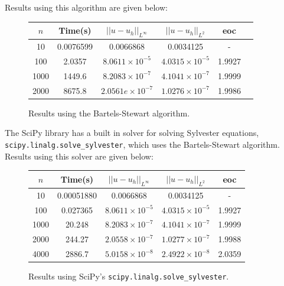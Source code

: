 \documentclass{article}
\numberwithin{equation}{section}
\begin{document}
Results using this algorithm are given below:

\begin{figure}
\begin{table}[H]
\centering
\begin{tabular}{|c|c|c|c|c|c|}
\hline
$n$ & Time(s) & $|| u - u_h ||_{L^{\infty}}$ &$|| u - u_h ||_{L^{2}}$ & eoc \\
\hline
10 & 0.0076599 & 0.0066868 & 0.0034125 & - \\
100 & 2.0357 & $8.0611 \times 10^{-5}$ & $4.0315 \times 10^{-5}$ & 1.9927 \\
1000 & 1449.6 & $8.2083 \times 10^{-7}$ & $4.1041 \times 10^{-7}$ & 1.9999 \\
2000 & 8675.8 & $2.0561e \times 10^{-7}$ & $1.0276 \times 10^{-7}$ & 1.9986 \\
\hline
\end{tabular}
\end{table}
\caption{Results using the Bartels-Stewart algorithm.}
\end{figure}

The SciPy library has a built in solver for solving Sylvester equations, \texttt{scipy.linalg.solve\_sylvester}, which uses the Bartels-Stewart algorithm. Results using this solver are given below:

\begin{figure}
\begin{table}[H]
\centering
\begin{tabular}{|c|c|c|c|c|}
\hline
$n$ & Time(s) & $|| u - u_h ||_{L^{\infty}}$ &$|| u - u_h ||_{L^{2}}$ & eoc \\
\hline
10 & 0.00051880 & 0.0066868 & 0.0034125 & -  \\
100 & 0.027365 & $8.0611 \times 10^{-5}$ & $4.0315 \times 10^{-5}$ & 1.9927  \\
1000 & 20.248 & $8.2083 \times 10^{-7}$ & $4.1041 \times 10^{-7}$ & 1.9999 \\
2000 & 244.27 & $2.0558 \times 10^{-7}$ & $1.0277 \times 10^{-7}$ & 1.9988  \\
4000 & 2886.7 & $5.0158 \times 10^{-8}$ & $2.4922 \times 10^{-8}$ & 2.0359 \\
\hline
\end{tabular}
\end{table}
\caption{Results using SciPy's \texttt{scipy.linalg.solve\_sylvester}.}
\end{figure}
\end{document}
